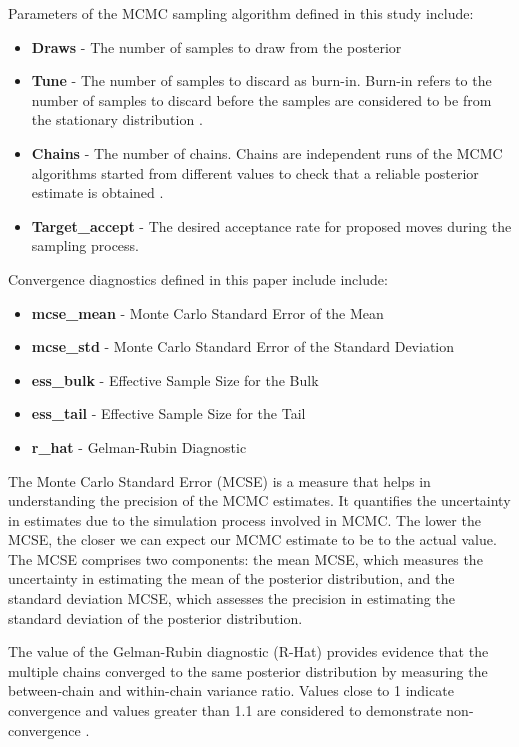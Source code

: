 Parameters of the MCMC sampling algorithm defined in this study include:
\begin{itemize}
  \item \textbf{Draws} - The number of samples to draw from the posterior
  \item \textbf{Tune} - The number of samples to discard as burn-in. Burn-in refers to the 
  number of samples to discard before the samples are considered to be from the stationary 
  distribution \cite{mcmc-convergence}.
  \item \textbf{Chains} - The number of chains. Chains are independent runs of
    the MCMC algorithms started from different values to check that a
    reliable posterior estimate is obtained \cite{mcmc-convergence}.
  \item \textbf{Target\_accept} - The desired acceptance rate for proposed moves during the sampling process.
\end{itemize}
Convergence diagnostics defined in this paper include include:
\begin{itemize}
  \item \textbf{mcse\_mean} - Monte Carlo Standard Error of the Mean
  \item \textbf{mcse\_std} - Monte Carlo Standard Error of the Standard Deviation
  \item \textbf{ess\_bulk} - Effective Sample Size for the Bulk
  \item \textbf{ess\_tail} - Effective Sample Size for the Tail
  \item \textbf{r\_hat} - Gelman-Rubin Diagnostic
\end{itemize}
The Monte Carlo Standard Error (MCSE) is a measure that helps in understanding
the precision of the MCMC estimates. It quantifies the uncertainty in
estimates due to the simulation process involved in MCMC. The lower the
MCSE, the closer we can expect our MCMC estimate to be to the actual value.
The MCSE comprises two components: the mean MCSE, which measures the
uncertainty in estimating the mean of the posterior distribution, and the
standard deviation MCSE, which assesses the precision in estimating the
standard deviation of the posterior distribution.

The value of the Gelman-Rubin diagnostic (R-Hat) provides evidence that the
multiple chains converged to the same posterior distribution by measuring the
between-chain and within-chain variance ratio. Values close to 1 indicate
convergence and values greater than 1.1 are considered to demonstrate
non-convergence \cite{statrethinking}.

